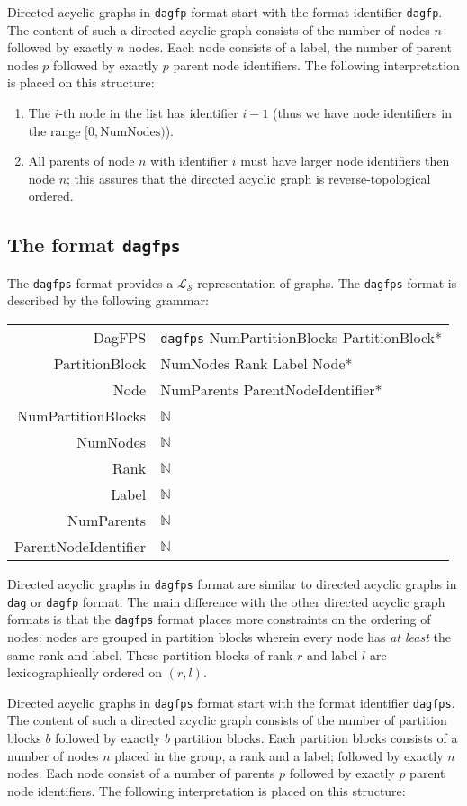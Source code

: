 \documentclass{article}
\makeatletter
\newenvironment{grammar}{\begin{tabular}{r@{ $~\longleftarrow~$ }l}}{\end{tabular}}
\newcommand{\grammarrule}[2]{#1&#2\\}
\newcommand{\List}{\mathcal{L}}
\newcommand{\ListSummary}{{\List_\mathcal{S}}}
\makeatother
\begin{document}
Directed acyclic graphs in {\tt dagfp} format start with the format identifier {\tt dagfp}. The content of such a directed acyclic graph consists of the number of nodes $n$ followed by exactly $n$ nodes. Each node consists of a label, the number of parent nodes $p$ followed by exactly $p$ parent node identifiers. The following interpretation is placed on this structure:

\begin{enumerate}
    \item The $i$-th node in the list has identifier $i-1$ (thus we have node identifiers in the range $[0, \mathrm{NumNodes})$).
    \item All parents of node $n$ with identifier $i$ must have larger node identifiers then node $n$; this assures that the directed acyclic graph is reverse-topological ordered.
\end{enumerate}

\subsection{The format {\tt dagfps}}
The {\tt dagfps} format provides a $\ListSummary$ representation of graphs. The {\tt dagfps} format is described by the following grammar:

\begin{grammar}
\grammarrule{DagFPS}{{\tt dagfps} NumPartitionBlocks PartitionBlock*}
\grammarrule{ PartitionBlock}{NumNodes Rank Label Node*}
\grammarrule{Node}{NumParents ParentNodeIdentifier*}
\grammarrule{ NumPartitionBlocks}{$\mathbb{N}$}
\grammarrule{NumNodes}{$\mathbb{N}$}
\grammarrule{Rank}{$\mathbb{N}$}
\grammarrule{Label}{$\mathbb{N}$}
\grammarrule{NumParents}{$\mathbb{N}$}
\grammarrule{ParentNodeIdentifier}{$\mathbb{N}$}
\end{grammar}

Directed acyclic graphs in {\tt dagfps} format are similar to directed acyclic graphs in {\tt dag} or {\tt dagfp} format. The main difference with the other directed acyclic graph formats is that the {\tt dagfps} format places more constraints on the ordering of nodes: nodes are grouped in partition blocks wherein every node has {\it at least} the same rank and label. These partition blocks of rank $r$ and label $l$ are lexicographically ordered on $(r, l)$.

Directed acyclic graphs in {\tt dagfps} format start with the format identifier {\tt dagfps}. The content of such a directed acyclic graph consists of the number of partition blocks $b$ followed by exactly $b$ partition blocks. Each partition blocks consists of a number of nodes $n$ placed in the group, a rank and a label; followed by exactly $n$ nodes. Each node consist of a number of parents $p$ followed by exactly $p$ parent node identifiers. The following interpretation is placed on this structure:
\end{document}

